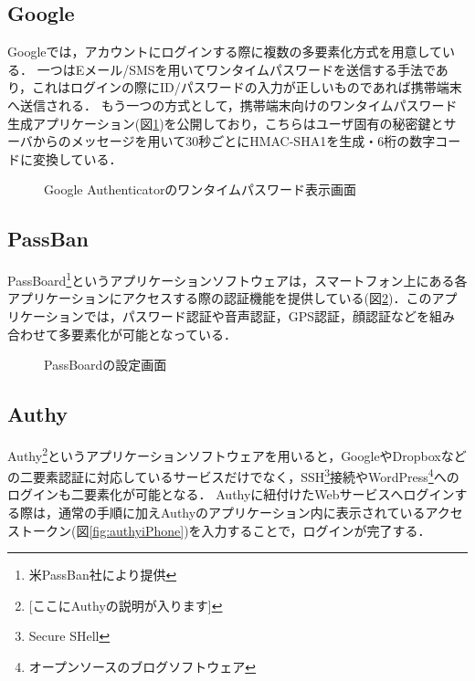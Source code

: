 \subsection{Google}
Googleでは，アカウントにログインする際に複数の多要素化方式を用意している．
一つはEメール/SMSを用いてワンタイムパスワードを送信する手法であり，これはログインの際にID/パスワードの入力が正しいものであれば携帯端末へ送信される．
もう一つの方式として，携帯端末向けのワンタイムパスワード生成アプリケーション(図\ref{fig:googleAuthenticator})を公開しており，こちらはユーザ固有の秘密鍵とサーバからのメッセージを用いて30秒ごとにHMAC-SHA1を生成・6桁の数字コードに変換している．

\begin{figure}[ht]
  \begin{center}
  \end{center}
  \caption{Google Authenticatorのワンタイムパスワード表示画面}
  \label{fig:googleAuthenticator}
\end{figure}

\subsection{PassBan}
PassBoard\footnote{米PassBan社により提供}というアプリケーションソフトウェアは，スマートフォン上にある各アプリケーションにアクセスする際の認証機能を提供している(図\ref{fig:passboard})．このアプリケーションでは，パスワード認証や音声認証，GPS認証，顔認証などを組み合わせて多要素化が可能となっている．

\begin{figure}[ht]
  \begin{center}
  \end{center}
  \caption{PassBoardの設定画面}
  \label{fig:passboard}
\end{figure}

\subsection{Authy}
Authy\footnote{[ここにAuthyの説明が入ります]}というアプリケーションソフトウェアを用いると，GoogleやDropboxなどの二要素認証に対応しているサービスだけでなく，SSH\footnote{Secure SHell}接続やWordPress\footnote{オープンソースのブログソフトウェア}へのログインも二要素化が可能となる．
Authyに紐付けたWebサービスへログインする際は，通常の手順に加えAuthyのアプリケーション内に表示されているアクセストークン(図\ref{fig:authyiPhone})を入力することで，ログインが完了する．

